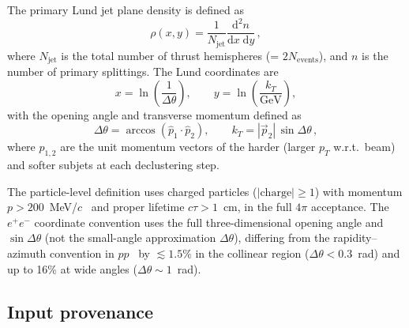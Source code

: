 \documentclass[11pt,a4paper]{article}
\begin{document}
The primary Lund jet plane density is defined as
\begin{equation}
  \rho(x, y) = \frac{1}{N_\text{jet}}
  \frac{\mathrm{d}^2 n}{\mathrm{d}x\;\mathrm{d}y}\,,
  \label{eq:rho-def}
\end{equation}
where $N_\text{jet}$ is the total number of thrust hemispheres
(= $2 N_\text{events}$), and $n$ is the number of primary
splittings.  The Lund coordinates are
\begin{equation}
  x = \ln\!\left(\frac{1}{\Delta\theta}\right), \qquad
  y = \ln\!\left(\frac{k_T}{\text{GeV}}\right),
  \label{eq:coords}
\end{equation}
with the opening angle and transverse momentum defined as
\begin{equation}
  \Delta\theta = \arccos\!\left(\hat{p}_1 \cdot \hat{p}_2\right),
  \qquad
  k_T = |\vec{p}_2|\,\sin\Delta\theta\,,
  \label{eq:kt-dtheta}
\end{equation}
where $\hat{p}_{1,2}$ are the unit momentum vectors of the harder
(larger $p_T$ w.r.t.\ beam) and softer subjets at each declustering
step.

The particle-level definition uses charged particles ($|\text{charge}|
\ge 1$) with momentum $p > 200$~MeV/$c$~\cite{ALEPH:1998hhr,ALEPH:1998vtv}
and proper lifetime $c\tau > 1$~cm, in the full $4\pi$ acceptance.
The $e^+e^-$ coordinate convention uses the full three-dimensional
opening angle and $\sin\Delta\theta$ (not the small-angle approximation
$\Delta\theta$), differing from the rapidity--azimuth convention in
$pp$~\cite{Dreyer:2018nbf} by $\lesssim\!1.5\%$ in the collinear
region ($\Delta\theta < 0.3$~rad) and up to 16\% at wide angles
($\Delta\theta \sim 1$~rad).

\subsection{Input provenance}
\label{sec:provenance}
\end{document}
